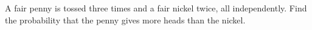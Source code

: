 A fair penny is tossed three times and a fair nickel twice, all independently. Find the probability that the penny gives more heads than the nickel.
